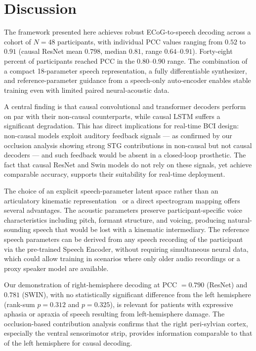 \documentclass[10pt]{article}
\begin{document}
\section{Discussion}

The framework presented here achieves robust ECoG-to-speech decoding across a cohort of $N=48$ participants, with individual PCC values ranging from $0.52$ to $0.91$ (causal ResNet mean $0.798$, median $0.81$, range $0.64$--$0.91$). Forty-eight percent of participants reached PCC in the $0.80$--$0.90$ range. The combination of a compact 18-parameter speech representation, a fully differentiable synthesizer, and reference-parameter guidance from a speech-only auto-encoder enables stable training even with limited paired neural-acoustic data.

A central finding is that causal convolutional and transformer decoders perform on par with their non-causal counterparts, while causal LSTM suffers a significant degradation. This has direct implications for real-time BCI design: non-causal models exploit auditory feedback signals --- as confirmed by our occlusion analysis showing strong STG contributions in non-causal but not causal decoders --- and such feedback would be absent in a closed-loop prosthetic. The fact that causal ResNet and Swin models do not rely on these signals, yet achieve comparable accuracy, supports their suitability for real-time deployment.

The choice of an explicit speech-parameter latent space rather than an articulatory kinematic representation~\cite{anumanchipalli2019speech} or a direct spectrogram mapping offers several advantages. The acoustic parameters preserve participant-specific voice characteristics including pitch, formant structure, and voicing, producing natural-sounding speech that would be lost with a kinematic intermediary. The reference speech parameters can be derived from any speech recording of the participant via the pre-trained Speech Encoder, without requiring simultaneous neural data, which could allow training in scenarios where only older audio recordings or a proxy speaker model are available.

Our demonstration of right-hemisphere decoding at PCC $=0.790$ (ResNet) and $0.781$ (SWIN), with no statistically significant difference from the left hemisphere (rank-sum $p=0.312$ and $p=0.325$), is relevant for patients with expressive aphasia or apraxia of speech resulting from left-hemisphere damage. The occlusion-based contribution analysis confirms that the right peri-sylvian cortex, especially the ventral sensorimotor strip, provides information comparable to that of the left hemisphere for causal decoding.
\end{document}
